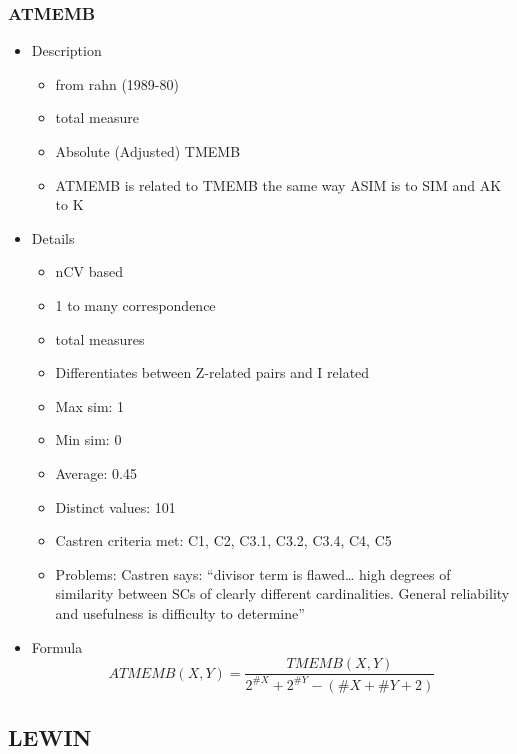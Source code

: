 \documentclass{article}
\begin{document}
\subsubsection{ATMEMB}
\label{sec-6-6-4}
\begin{itemize}

\item Description
\label{sec-6-6-4-1}%
\begin{itemize}
\item from rahn (1989-80)
\item total measure
\item Absolute (Adjusted) TMEMB
\item ATMEMB is related to TMEMB the same way ASIM is to SIM and AK to K
\end{itemize}

\item Details
\label{sec-6-6-4-2}%
\begin{itemize}
\item nCV based
\item 1 to many correspondence
\item total measures
\item Differentiates between Z-related pairs and I related
\item Max sim: 1
\item Min sim: 0
\item Average: 0.45
\item Distinct values: 101
\item Castren criteria met: C1, C2, C3.1, C3.2, C3.4, C4, C5
\item Problems: Castren says: ``divisor term is flawed\ldots{} high degrees of
  similarity between SCs of clearly different cardinalities. General
  reliability and usefulness is difficulty to determine''
\end{itemize}

\item Formula\\
\label{sec-6-6-4-3}%
$$ ATMEMB\left(X,Y\right)=\frac{TMEMB\left(X,Y\right)}{2^{\#X}+2^{\#Y}-\left(\#X+\#Y+2\right)} $$
\end{itemize} %
\subsection{LEWIN}
\label{sec-6-7}
\end{document}
